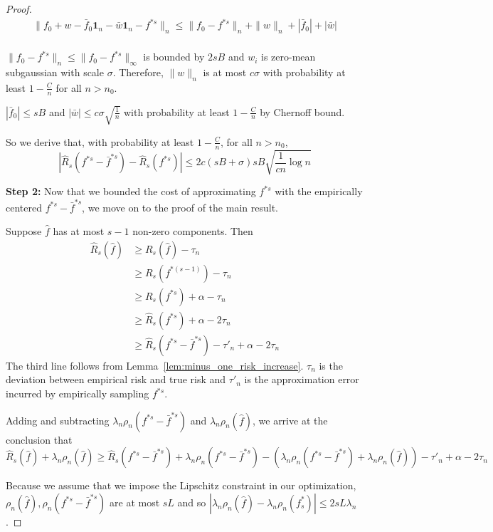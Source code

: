 \begin{proof}
\begin{align*}
\| f_0 + w -\bar{f}_0\mathbf{1}_n 
                       - \bar{w} \mathbf{1}_n - f^{*s} \|_n 
	\leq \| f_0 - f^{*s} \|_n + \|w\|_n + |\bar{f}_0| + |\bar{w}|\\
\end{align*}

$\|f_0 - f^{*s}\|_n \leq \|f_0 - f^{*s}\|_\infty $ is bounded by $2sB$ and $w_i$ is zero-mean subgaussian with scale $\sigma$. Therefore, $\|w\|_n$ is at most $c\sigma$ with probability at least $1-\frac{C}{n}$ for all $n > n_0$. 

$| \bar{f}_0 | \leq s B$ and $| \bar{w} | \leq c \sigma \sqrt{\frac{1}{n}}$ with probability at least $1-\frac{C}{n}$ by Chernoff bound.

So we derive that, with probability at least $1 -\frac{C}{n}$, for all $n > n_0$,
\[
|\hat{R}_s(f^{*s} - \bar{f}^{*s}) - \hat{R}_s(f^{*s})| \leq 2c (sB+\sigma) sB \sqrt{\frac{1}{cn} \log n}
\]

\textbf{Step 2:} Now that we bounded the cost of approximating $f^{*s}$ with the empirically centered $f^{*s} - \bar{f}^{*s}$, we move on to the proof of the main result.

Suppose $\hat{f}$ has at most $s-1$ non-zero components. Then
\begin{align*}
\hat{R}_s( \hat{f}) &\geq R_s(\hat{f}) - \tau_n \\
	&\geq R_s(f^{*(s-1)}) - \tau_n \\
	&\geq R_s(f^{*s}) + \alpha - \tau_n \\
	&\geq \hat{R}_s(f^{*s}) + \alpha - 2 \tau_n \\
	&\geq \hat{R}_s(f^{*s} - \bar{f}^{*s}) -\tau'_n + \alpha - 2\tau_n 
\end{align*}
The third line follows from Lemma~\ref{lem:minus_one_risk_increase}.
$\tau_n$ is the deviation between empirical risk and true risk and $\tau'_n$ is the approximation error incurred by empirically sampling $f^{*s}$.

Adding and subtracting $ \lambda_n \rho_n(f^{*s} - \bar{f}^{*s})$ and $ \lambda_n \rho_n(\hat{f})$, we arrive at the conclusion that
\[
\hat{R}_s(\hat{f}) + \lambda_n \rho_n(\hat{f}) \geq \hat{R}_s(f^{*s} - \bar{f}^{*s}) + \lambda_n \rho_n(f^{*s} - \bar{f}^{*s}) - ( \lambda_n \rho_n(f^{*s} - \bar{f}^{*s}) + \lambda_n \rho_n(\hat{f}) ) -\tau'_n + \alpha - 2 \tau_n
\]

Because we assume that we impose the Lipschitz constraint in our optimization, $\rho_n(\hat{f}), \rho_n(f^{*s} - \bar{f}^{*s})$ are at most $sL$ and so $|\lambda_n \rho_n(\hat{f}) - \lambda_n \rho_n(f^*_s)| \leq 2 sL \lambda_n$. 



\end{proof}
